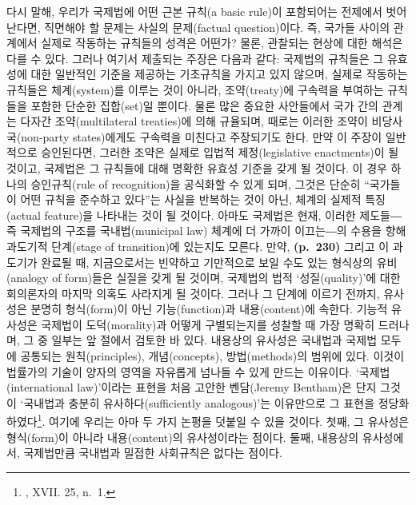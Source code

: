 다시 말해, 우리가 국제법에 어떤 근본 규칙(a basic rule)이 
포함되어는 전제에서 벗어난다면, 직면해야 할 문제는
사실의 문제(factual question)이다. 즉, 국가들 사이의 관계에서 실제로
작동하는 규칙들의 성격은 어떤가? 물론, 관찰되는 현상에 대한 해석은 다를
수 있다. 그러나 여기서 제출되는 주장은 다음과 같다: 국제법의 규칙들은 그
유효성에 대한 일반적인 기준을 제공하는 기초규칙을 가지고 있지 않으며,
실제로 작동하는 규칙들은 체계(system)를 이루는 것이 아니라,
조약(treaty)에 구속력을 부여하는 규칙들을 포함한 단순한 집합(set)일
뿐이다. 물론 많은 중요한 사안들에서 국가 간의 관계는 다자간
조약(multilateral treaties)에 의해 규율되며, 때로는 이러한 조약이
비당사국(non-party states)에게도 구속력을 미친다고 주장되기도 한다. 만약
이 주장이 일반적으로 승인된다면, 그러한 조약은 실제로 입법적
제정(legislative enactments)이 될 것이고, 국제법은 그 규칙들에 대해
명확한 유효성 기준을 갖게 될 것이다. 이 경우 하나의 승인규칙(rule of
recognition)을 공식화할 수 있게 되며, 그것은 단순히 ``국가들이 어떤
규칙을 준수하고 있다''는 사실을 반복하는 것이 아닌, 체계의 실제적
특징(actual feature)을 나타내는 것이 될 것이다. 아마도 국제법은 현재,
이러한 제도들―즉 국제법의 구조를 국내법(municipal law) 체계에 더 가까이
이끄는―의 수용을 향해 과도기적 단계(stage of transition)에 있는지도
모른다. 만약, \textbf{(p.~230)} 그리고 이 과도기가 완료될 때,
지금으로서는 빈약하고 기만적으로 보일 수도 있는 형식상의 유비(analogy of
form)들은 실질을 갖게 될 것이며, 국제법의 법적 `성질(quality)'에 대한
회의론자의 마지막 의혹도 사라지게 될 것이다. 그러나 그 단계에 이르기
전까지, 유사성은 분명히 형식(form)이 아닌 기능(function)과
내용(content)에 속한다. 기능적 유사성은 국제법이 도덕(morality)과 어떻게
구별되는지를 성찰할 때 가장 명확히 드러나며, 그 중 일부는 앞 절에서
검토한 바 있다. 내용상의 유사성은 국내법과 국제법 모두에 공통되는
원칙(principles), 개념(concepts), 방법(methods)의 범위에 있다. 이것이
법률가의 기술이 양자의 영역을 자유롭게 넘나들 수 있게 만드는 이유이다.
`국제법(international law)'이라는 표현을 처음 고안한 벤담(Jeremy
Bentham)은 단지 그것이 `국내법과 충분히 유사하다(sufficiently
analogous)'는 이유만으로 그 표현을 정당화하였다\footnote{, XVII. 25, n.~1.}. 여기에 우리는 아마 두
가지 논평을 덧붙일 수 있을 것이다. 첫째, 그 유사성은 형식(form)이 아니라
내용(content)의 유사성이라는 점이다. 둘째, 내용상의 유사성에서,
국제법만큼 국내법과 밀접한 사회규칙은 없다는 점이다.

\newpage

